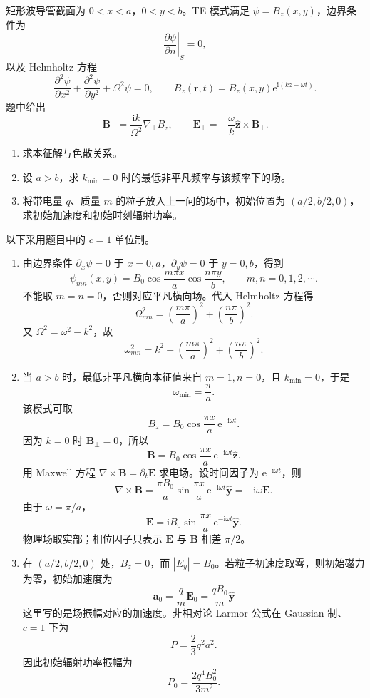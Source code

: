 \begin{question}[矩形波导管的 TE 模式]
矩形波导管截面为 $0<x<a$，$0<y<b$。TE 模式满足 $\psi=B_z(x,y)$，边界条件为
\[
  \left.\frac{\partial\psi}{\partial n}\right|_S=0,
\]
以及 Helmholtz 方程
\[
  \frac{\partial^2\psi}{\partial x^2}+\frac{\partial^2\psi}{\partial y^2}+\Omega^2\psi=0,
  \qquad
  B_z(\mathbf r,t)=B_z(x,y)\mathrm e^{\mathrm i(kz-\omega t)} .
\]
题中给出
\[
  \mathbf B_\perp=\frac{\mathrm i k}{\Omega^2}\nabla_\perp B_z,
  \qquad
  \mathbf E_\perp=-\frac{\omega}{k}\hat{\mathbf z}\times\mathbf B_\perp .
\]
\begin{enumerate}
  \item 求本征解与色散关系。
  \item 设 $a>b$，求 $k_{\min}=0$ 时的最低非平凡频率与该频率下的场。
  \item 将带电量 $q$、质量 $m$ 的粒子放入上一问的场中，初始位置为 $(a/2,b/2,0)$，求初始加速度和初始时刻辐射功率。
\end{enumerate}
\begin{solution}
以下采用题目中的 $c=1$ 单位制。
\begin{enumerate}
  \item 由边界条件 $\partial_x\psi=0$ 于 $x=0,a$，$\partial_y\psi=0$ 于 $y=0,b$，得到
  \[
    \psi_{mn}(x,y)=B_0\cos\frac{m\pi x}{a}\cos\frac{n\pi y}{b},
    \qquad m,n=0,1,2,\cdots .
  \]
  不能取 $m=n=0$，否则对应平凡横向场。代入 Helmholtz 方程得
  \[
    \Omega_{mn}^2=\left(\frac{m\pi}{a}\right)^2+
    \left(\frac{n\pi}{b}\right)^2 .
  \]
  又 $\Omega^2=\omega^2-k^2$，故
  \[
    \boxed{\omega_{mn}^2=k^2+\left(\frac{m\pi}{a}\right)^2+
    \left(\frac{n\pi}{b}\right)^2} .
  \]

  \item 当 $a>b$ 时，最低非平凡横向本征值来自 $m=1,n=0$，且 $k_{\min}=0$，于是
  \[
    \boxed{\omega_{\min}=\frac{\pi}{a}} .
  \]
  该模式可取
  \[
    B_z=B_0\cos\frac{\pi x}{a}\,\mathrm e^{-\mathrm i\omega t} .
  \]
  因为 $k=0$ 时 $\mathbf B_\perp=0$，所以
  \[
    \mathbf B=B_0\cos\frac{\pi x}{a}\,\mathrm e^{-\mathrm i\omega t}\hat{\mathbf z} .
  \]
  用 Maxwell 方程 $\nabla\times\mathbf B=\partial_t\mathbf E$ 求电场。设时间因子为 $\mathrm e^{-\mathrm i\omega t}$，则
  \[
    \nabla\times\mathbf B=\frac{\pi B_0}{a}\sin\frac{\pi x}{a}\,\mathrm e^{-\mathrm i\omega t}\hat{\mathbf y}
    =-\mathrm i\omega\mathbf E .
  \]
  由于 $\omega=\pi/a$，
  \[
    \boxed{\mathbf E=\mathrm iB_0\sin\frac{\pi x}{a}\,\mathrm e^{-\mathrm i\omega t}\hat{\mathbf y}} .
  \]
  物理场取实部；相位因子只表示 $\mathbf E$ 与 $\mathbf B$ 相差 $\pi/2$。

  \item 在 $(a/2,b/2,0)$ 处，$B_z=0$，而 $|E_y|=B_0$。若粒子初速度取零，则初始磁力为零，初始加速度为
  \[
    \boxed{\mathbf a_0=\frac{q}{m}\mathbf E_0
    =\frac{qB_0}{m}\hat{\mathbf y}}
  \]
  这里写的是场振幅对应的加速度。非相对论 Larmor 公式在 Gaussian 制、$c=1$ 下为
  \[
    P=\frac23q^2a^2 .
  \]
  因此初始辐射功率振幅为
  \[
    \boxed{P_0=\frac{2q^4B_0^2}{3m^2}} .
  \]
\end{enumerate}
\end{solution}
\end{question}

